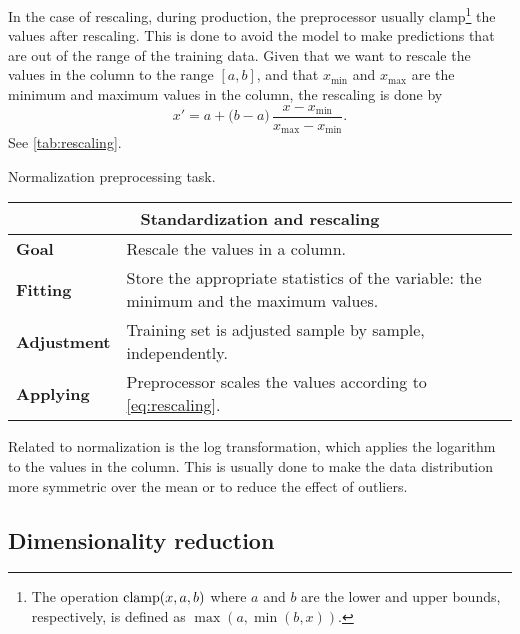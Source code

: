 In the case of rescaling, during production, the preprocessor usually clamp\footnote{The
operation $\operatorname{clamp}(x, a, b)$ where $a$ and $b$ are the lower and upper bounds,
respectively, is defined as $\max(a, \min(b, x))$.} the values after rescaling.  This is
done to avoid the model to make predictions that are out of the range of the training
data.  Given that we want to rescale the values in the column to the range $[a, b]$, and
that $x_\text{min}$ and $x_\text{max}$ are the minimum and maximum values in the column,
the rescaling is done by
\begin{equation}
  \label{eq:rescaling}
  x' = a + \big(b - a\big) \, \frac{x - x_\text{min}}{x_\text{max} - x_\text{min}}\text{.}
\end{equation}
See \cref{tab:rescaling}.

\begin{tablebox}[label=tab:rescaling]{Normalization preprocessing task.}
  \centering
  \begin{tabular}{lp{6cm}}
    \toprule
    \multicolumn{2}{c}{\textbf{Standardization and rescaling}} \\
    \midrule
    \textbf{Goal} &
      Rescale the values in a column. \\
    \textbf{Fitting} &
      Store the appropriate statistics of the variable: the minimum and the maximum
      values. \\
    \textbf{Adjustment} &
      Training set is adjusted sample by sample, independently. \\
    \textbf{Applying} &
      Preprocessor scales the values according to \cref{eq:rescaling}. \\
    \bottomrule
  \end{tabular}
\end{tablebox}

Related to normalization is the log transformation, which applies the logarithm to the
values in the column.  This is usually done to make the data distribution more symmetric
over the mean or to reduce the effect of outliers.


\subsection{Dimensionality reduction}

